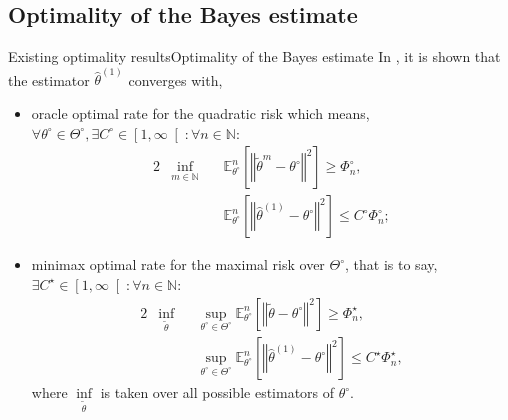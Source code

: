 \documentclass[10pt]{beamer}
\begin{document}
\subsection{Optimality of the Bayes estimate}
\begin{frame}{Existing optimality results}{Optimality of the Bayes estimate}
In \citet{JJASRS}, it is shown that the estimator $\widehat{\theta}^{\left(1\right)}$ \textcolor{red!90!black}{converges with,}
	\begin{itemize}
		\item \textcolor{red!90!black}{oracle optimal rate} for the quadratic risk which means, $\forall \theta^{\circ} \in \Theta^{\circ}, \exists C^{\circ} \in \left[ 1, \infty \right[ : \forall n \in \mathbb{N}:$
		\begin{alignat*}{2}
&\inf\limits_{m \in \mathbb{N}} \, && \mathbb{E}_{\theta^{\circ}}^{n}\left[\left\Vert \widetilde{\theta}^{m} - \theta^{\circ} \right\Vert^{2}\right] \geq \Phi_{n}^{\circ},\\
& && \mathbb{E}_{\theta^{\circ}}^{n}\left[\left\Vert \widehat{\theta}^{\left(1\right)} - \theta^{\circ} \right\Vert^{2}\right] \leq C^{\circ} \Phi_{n}^{\circ};
		\end{alignat*}
		\item \textcolor{red!90!black}{minimax optimal rate} for the maximal risk over $\Theta^{\circ}$, that is to say, $\exists C^{\star} \in \left[ 1, \infty \right[ : \forall n \in \mathbb{N}:$
\begin{alignat*}{2}
& \inf\limits_{\widetilde{\theta}} &&\sup\limits_{\theta^{\circ} \in \Theta^{\circ}} \mathbb{E}_{\theta^{\circ}}^{n}\left[\left\Vert \widetilde{\theta} - \theta^{\circ} \right\Vert^{2}\right] \geq \Phi_{n}^{\star},\\
& && \sup\limits_{\theta^{\circ} \in \Theta^{\circ}} \mathbb{E}_{\theta^{\circ}}^{n}\left[\left\Vert \widehat{\theta}^{\left(1\right)} - \theta^{\circ} \right\Vert^{2}\right] \leq C^{\star} \Phi_{n}^{\star},
\end{alignat*}
where $\inf\limits_{\widetilde{\theta}}$ is taken over all possible estimators of $\theta^{\circ}$.
	\end{itemize}

\end{frame}
\end{document}
